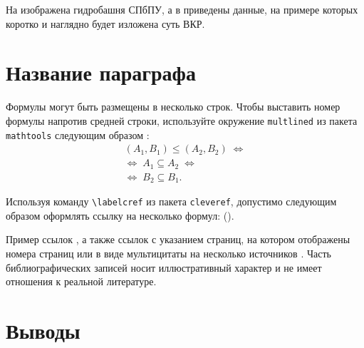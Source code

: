 
На  изображена гидробашня СПбПУ, а в  приведены данные, на примере которых коротко и наглядно будет изложена суть ВКР.


\section{Название параграфа} \label{ch1:sec2} 



Формулы могут быть размещены в несколько строк. Чтобы выставить номер формулы напротив средней строки, используйте окружение \verb|multlined| из пакета \verb|mathtools| следующим образом \cite{Ganter1999}:
%
\begin{equation} 
\label{eq:fConcept-order-ch1}
\begin{multlined}
(A_1,B_1)\leq (A_2,B_2)\; \Leftrightarrow \\  \Leftrightarrow\; A_1\subseteq A_2\; \Leftrightarrow \\ \Leftrightarrow\; B_2\subseteq B_1. 
\end{multlined}
\end{equation}


Используя команду \verb|\labelcref| из пакета \verb|cleveref|, допустимо следующим образом оформлять ссылку на несколько формул:
().
%
%

Пример ссылок \cite{Article,Book,Booklet,Conference,Inbook,Incollection,Manual,Mastersthesis,Misc,Phdthesis,Proceedings,Techreport,Unpublished,badiou:briefings}, а также ссылок с указанием страниц, на котором отображены номера страниц  \cite[с.~96]{Naidenova2017} или в виде мультицитаты на несколько источников \cites[с.~96]{Naidenova2017}[с.~46]{Ganter1999}. Часть библиографических записей носит иллюстративный характер и не имеет отношения к реальной литературе. 




\section{Выводы} \label{ch1:conclusion}

